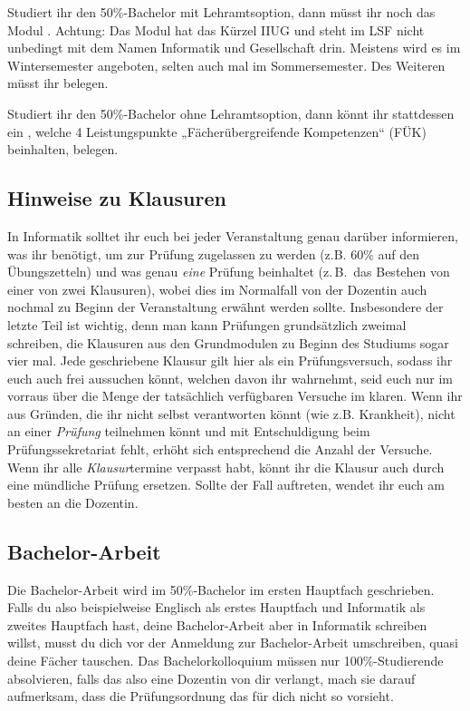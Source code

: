 Studiert ihr den 50\%-Bachelor mit Lehramtsoption, dann müsst ihr noch das Modul . Achtung: Das Modul hat das Kürzel IIUG und steht im LSF nicht unbedingt mit dem Namen Informatik und Gesellschaft drin. Meistens wird es im Wintersemester angeboten, selten auch mal im Sommersemester. Des Weiteren müsst ihr  belegen.

Studiert ihr den 50\%-Bachelor ohne Lehramtsoption, dann könnt ihr stattdessen ein , welche 4 Leistungspunkte „Fächerübergreifende Kompetenzen“ (FÜK) beinhalten, belegen.

\subsection{Hinweise zu Klausuren}
In Informatik solltet ihr euch bei jeder Veranstaltung genau darüber informieren, was ihr benötigt, um zur Prüfung zugelassen zu werden (z.B. 60\% auf den Übungszetteln) und was genau \emph{eine} Prüfung beinhaltet (z.\,B.\ das Bestehen von einer von zwei Klausuren), wobei dies im Normalfall von der Dozentin auch nochmal zu Beginn der Veranstaltung erwähnt werden sollte. Insbesondere der letzte Teil ist wichtig, denn man kann Prüfungen grundsätzlich zweimal schreiben, die Klausuren aus den Grundmodulen zu Beginn des Studiums sogar vier mal. Jede geschriebene Klausur gilt hier als ein Prüfungsversuch, sodass ihr euch auch frei aussuchen könnt, welchen davon ihr wahrnehmt, seid euch nur im vorraus über die Menge der tatsächlich verfügbaren Versuche im klaren. Wenn ihr aus Gründen, die ihr nicht selbst verantworten könnt (wie z.B. Krankheit), nicht an einer \emph{Prüfung} teilnehmen könnt und mit Entschuldigung beim Prüfungssekretariat fehlt, erhöht sich entsprechend die Anzahl der Versuche. Wenn ihr alle \emph{Klausur}termine verpasst habt, könnt ihr die Klausur auch durch eine mündliche Prüfung ersetzen. Sollte der Fall auftreten, wendet ihr euch am besten an die Dozentin.

\subsection{Bachelor-Arbeit}
Die Bachelor-Arbeit wird im 50\%-Bachelor im ersten Hauptfach geschrieben. Falls du also beispielweise Englisch als erstes Hauptfach und Informatik als zweites Hauptfach hast, deine Bachelor-Arbeit aber in Informatik schreiben willst, musst du dich vor der Anmeldung zur Bachelor-Arbeit umschreiben, quasi deine Fächer tauschen. Das Bachelorkolloquium müssen nur 100\%-Studierende absolvieren, falls das also eine Dozentin von dir verlangt, mach sie darauf aufmerksam, dass die Prüfungsordnung das für dich nicht so vorsieht.
